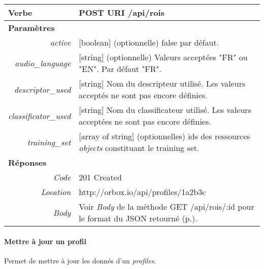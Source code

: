 \begin{appendices}
\begin{absolutelynopagebreak}
\begin{tabular}{@{}p{2cm}p{11.5cm}@{}}
    \toprule
    \textbf{Verbe}                        & POST \hspace{2.5cm} \textbf{URI} \hspace{0.25cm} /api/rois   \\ \midrule
    \textbf{Paramètres}                   &        \\
    \multicolumn{1}{r}{\textit{active}}  & [boolean] (optionnelle) false par défaut. \\
    \multicolumn{1}{r}{\textit{audio\_language}}  & [string] (optionnelle) Valeurs acceptées "FR" ou "EN".
    Par défaut "FR". \\
    \multicolumn{1}{r}{\textit{descriptor\_used}}  & [string] Nom du descripteur utilisé.
    Les valeurs acceptés ne sont pas encore définies.\\
    \multicolumn{1}{r}{\textit{classificator\_used}}  & [string] Nom du classificateur utilisé.
    Les valeurs acceptées ne sont pas encore définies.\\
    \multicolumn{1}{r}{\textit{training\_set}}  & [array of string] (optionnelles) ids des ressources \emph{objects} constituant le training set.\\
    \midrule
    \textbf{Réponses}                     &        \\
    \multicolumn{1}{r}{\textit{Code}}   & 201 Created \\
    \multicolumn{1}{r}{\textit{Location}}   & http://orbox.io/api/profiles/1a2b3c \\\multicolumn{1}{r}{\textit{Body}}   & Voir \emph{Body} de la méthode GET /api/rois/:id pour le format du JSON retourné (p.\pageref{jsonHalProfiles}). \\ \bottomrule
\end{tabular}
\end{absolutelynopagebreak}

\begin{absolutelynopagebreak}
\paragraph{Mettre à jour un profil}

Permet de mettre à jour les donnés d'un \emph{profiles}.


\end{absolutelynopagebreak}
\end{appendices}

